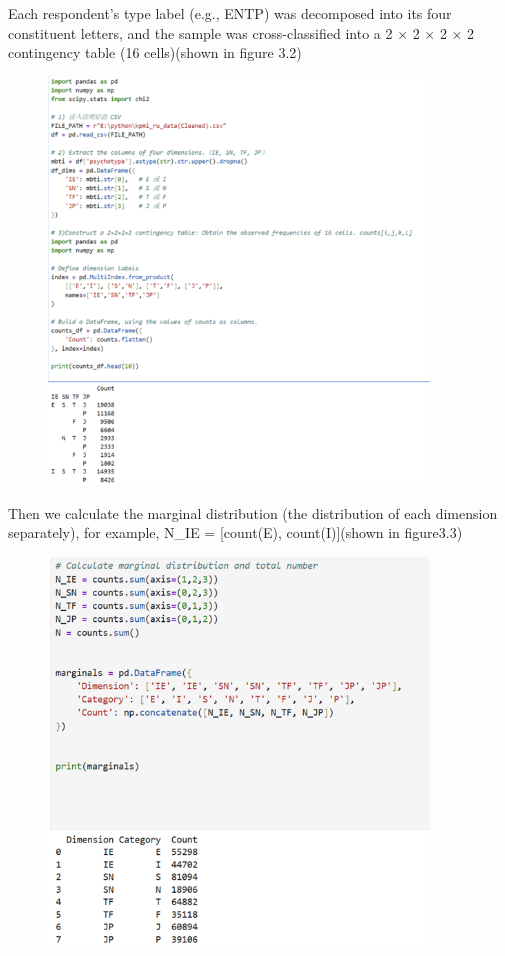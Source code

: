 \documentclass[12pt]{article}
\begin{document}
	Each respondent’s type label (e.g., ENTP) was decomposed into its four constituent letters, and the sample was cross-classified into a 2 × 2 × 2 × 2 contingency table (16 cells)(shown in figure 3.2) 
	\begin{figure}[H]
		\centering
		\includegraphics[width=0.9\textwidth]{Q1P8}
		
	\end{figure}
	Then we calculate the marginal distribution (the distribution of each dimension separately), for example, N\_IE = [count(E), count(I)](shown in figure3.3)
	\begin{figure}[H]
		\centering
		\includegraphics[width=0.9\textwidth]{Q1P9}
		
	\end{figure}
\end{document}
